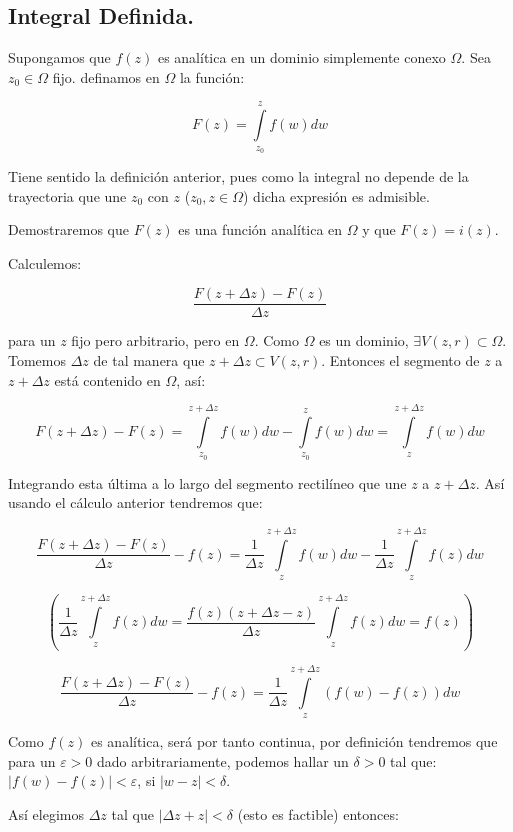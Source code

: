 \documentclass[a4paper,12pt]{article}
\begin{document}
\subsection{Integral Definida.}

Supongamos que $f(z)$ es analítica en un dominio simplemente conexo $\Omega$. Sea $z_0 \in \Omega$ fijo. definamos en $\Omega$ la función:

\[ F(z) = \int\limits_{z_0}^{z} f(w)dw \]

Tiene sentido la definición anterior, pues como la integral no depende de la trayectoria que une $z_0$ con $z$ ($z_0, z \in \Omega$) dicha expresión es admisible.

Demostraremos que $F(z)$ es una función analítica en $\Omega$ y que $F(z) = i(z)$.

Calculemos:

\[ \frac{F(z + \Delta z) - F(z)}{\Delta z} \]

para un $z$ fijo pero arbitrario, pero en $\Omega$. Como $\Omega$ es un dominio, $\exists V(z, r) \subset \Omega$. Tomemos $\Delta z$ de tal manera que $z + \Delta z \subset V(z, r)$. Entonces el segmento de $z$ a $z + \Delta z$ está contenido en $\Omega$, así:

\[ F(z + \Delta z) - F(z) = \int\limits_{z_0}^{z + \Delta z} f(w)dw - \int\limits_{z_0}^{z} f(w)dw = \int\limits_{z}^{z + \Delta z} f(w)dw \]



Integrando esta última a lo largo del segmento rectilíneo que une $z$ a $z + \Delta z$. Así usando el cálculo anterior tendremos que:

\[
\frac{F(z + \Delta z) - F(z)}{\Delta z} - f(z) = \frac{1}{\Delta z} \int\limits_{z}^{z + \Delta z} f(w)dw - \frac{1}{\Delta z} \int\limits_{z}^{z + \Delta z} f(z)dw
\]

\[
\left( \frac{1}{\Delta z} \int\limits_{z}^{z + \Delta z} f(z)dw = \frac{f(z)(z + \Delta z - z)}{\Delta z} \int\limits_{z}^{z + \Delta z} f(z)dw = f(z) \right)
\]

\[
\frac{F(z + \Delta z) - F(z)}{\Delta z} - f(z) = \frac{1}{\Delta z} \int\limits_{z}^{z + \Delta z} (f(w) - f(z))dw
\]

Como $f(z)$ es analítica, será por tanto continua, por definición tendremos que para un $\varepsilon > 0$ dado arbitrariamente, podemos hallar un $\delta > 0$ tal que: $|f(w) - f(z)| < \varepsilon$, si $|w - z| < \delta$.

Así elegimos $\Delta z$ tal que $|\Delta z + z| < \delta$ (esto es factible) entonces:
\end{document}
